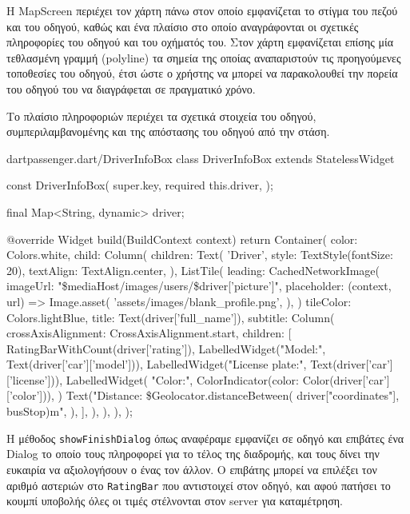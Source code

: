 \documentclass[../thesis.tex]{subfiles}
\begin{document}
Η MapScreen περιέχει τον χάρτη πάνω στον οποίο εμφανίζεται το στίγμα του πεζού και του οδηγού, καθώς και ένα πλαίσιο στο οποίο αναγράφονται οι σχετικές πληροφορίες του οδηγού και του οχήματός του.
Στον χάρτη εμφανίζεται επίσης μία τεθλασμένη γραμμή (polyline) τα σημεία της οποίας αναπαριστούν τις προηγούμενες τοποθεσίες του οδηγού, έτσι ώστε ο χρήστης να μπορεί να παρακολουθεί την πορεία του οδηγού του να διαγράφεται σε πραγματικό χρόνο.

Το πλαίσιο πληροφοριών περιέχει τα σχετικά στοιχεία του οδηγού, συμπεριλαμβανομένης και της απόστασης του οδηγού από την στάση.

\begin{codeblock}{dart}{passenger.dart/DriverInfoBox}
  class DriverInfoBox extends StatelessWidget {
    const DriverInfoBox({
      super.key,
      required this.driver,
    });

    final Map<String, dynamic> driver;

    @override
    Widget build(BuildContext context) {
      return Container(
        color: Colors.white,
        child: Column(
          children: Text(
            'Driver',
            style: TextStyle(fontSize: 20),
            textAlign: TextAlign.center,
          ),
          ListTile(
            leading: CachedNetworkImage(
              imageUrl: "\$mediaHost/images/users/\${driver['picture']}",
              placeholder: (context, url) => Image.asset(
                'assets/images/blank_profile.png',
              ),
            )
            tileColor: Colors.lightBlue,
            title: Text(driver['full_name']),
            subtitle: Column(
              crossAxisAlignment: CrossAxisAlignment.start,
              children: [
                RatingBarWithCount(driver['rating']),
                LabelledWidget("Model:", Text(driver['car']['model'])),
                LabelledWidget("License plate:", Text(driver['car']['license'])),
                LabelledWidget(
                  "Color:",
                  ColorIndicator(color: Color(driver['car']['color'])),
                )
                Text("Distance: \${Geolocator.distanceBetween(
                      driver["coordinates"],
                      busStop)}m",
                ),
              ],
            ),
          ),
        ),
      );
    }
  }
\end{codeblock}

Η μέθοδος \texttt{showFinishDialog} όπως αναφέραμε εμφανίζει σε οδηγό και επιβάτες ένα Dialog το οποίο τους πληροφορεί για το τέλος της διαδρομής, και τους δίνει την ευκαιρία να αξιολογήσουν ο ένας τον άλλον.
Ο επιβάτης μπορεί να επιλέξει τον αριθμό αστεριών στο \texttt{RatingBar} που αντιστοιχεί στον οδηγό, και αφού πατήσει το κουμπί υποβολής όλες οι τιμές στέλνονται στον server για καταμέτρηση.
\end{document}
